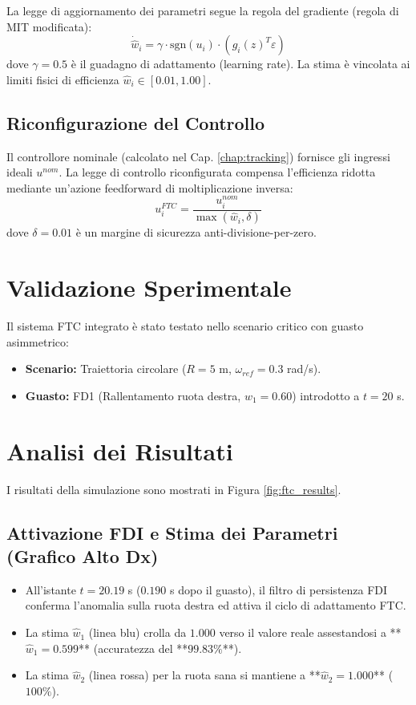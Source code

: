 La legge di aggiornamento dei parametri segue la regola del gradiente (regola di MIT modificata):
\begin{equation}
    \dot{\hat{w}}_i = \gamma \cdot \text{sgn}(u_i) \cdot \left( g_i(z)^T \varepsilon \right)
\end{equation}
dove \( \gamma = 0.5 \) è il guadagno di adattamento (learning rate). La stima è vincolata ai limiti fisici di efficienza \( \hat{w}_i \in [0.01, 1.00] \).

\subsection{Riconfigurazione del Controllo}
Il controllore nominale (calcolato nel Cap. \ref{chap:tracking}) fornisce gli ingressi ideali \( u^{nom} \). La legge di controllo riconfigurata compensa l'efficienza ridotta mediante un'azione feedforward di moltiplicazione inversa:
\begin{equation}
    u_i^{FTC} = \frac{u_i^{nom}}{\max(\hat{w}_i, \delta)}
\end{equation}
dove \( \delta = 0.01 \) è un margine di sicurezza anti-divisione-per-zero.

\section{Validazione Sperimentale}
Il sistema FTC integrato è stato testato nello scenario critico con guasto asimmetrico:
\begin{itemize}
    \item \textbf{Scenario:} Traiettoria circolare (\( R=5 \) m, \( \omega_{ref}=0.3 \) rad/s).
    \item \textbf{Guasto:} FD1 (Rallentamento ruota destra, \( w_1=0.60 \)) introdotto a \( t=20 \) s.
\end{itemize}

\section{Analisi dei Risultati}
I risultati della simulazione sono mostrati in Figura \ref{fig:ftc_results}.

\subsection{Attivazione FDI e Stima dei Parametri (Grafico Alto Dx)}
\begin{itemize}
    \item All'istante \( t = 20.19 \) s (\( 0.190 \) s dopo il guasto), il filtro di persistenza FDI conferma l'anomalia sulla ruota destra ed attiva il ciclo di adattamento FTC.
    \item La stima \( \hat{w}_1 \) (linea blu) crolla da \( 1.000 \) verso il valore reale assestandosi a **\( \hat{w}_1 = 0.599 \)** (accuratezza del **\( 99.83\% \)**).
    \item La stima \( \hat{w}_2 \) (linea rossa) per la ruota sana si mantiene a **\( \hat{w}_2 = 1.000 \)** (\( 100\% \)).
\end{itemize}

